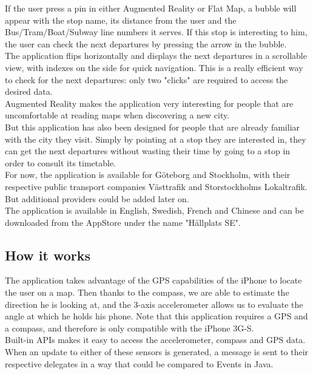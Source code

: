 If the user press a pin in either Augmented Reality or Flat Map, a bubble will appear with the stop name, its distance from the user and the Bus/Tram/Boat/Subway line numbers it serves. If this stop is interesting to him, the user can check the next departures by pressing the arrow in the bubble.\\

The application flips horizontally and displays the next departures in a scrollable view, with indexes on the side for quick navigation. This is a really efficient way to check for the next departures: only two "clicks" are required to access the desired data.\\

Augmented Reality makes the application very interesting for people that are uncomfortable at reading maps when discovering a new city.\\

But this application has also been designed for people that are already familiar with the city they visit. Simply by pointing at a stop they are interested in, they can get the next departures without wasting their time by going to a stop in order to consult its timetable.\\

For now, the application is available for Göteborg and Stockholm, with their respective public transport companies Västtrafik and Storstockholms Lokaltrafik. But additional providers could be added later on.\\

The application is available in English, Swedish, French and Chinese and can be downloaded from the AppStore under the name "Hållplats SE".

\subsection{How it works}

The application takes advantage of the GPS capabilities of the iPhone to locate the user on a map. Then thanks to the compass, we are able to estimate the direction he is looking at, and the 3-axis accelerometer allows us to evaluate the angle at which he holds his phone. Note that this application requires a GPS and a compass, and therefore is only compatible with the iPhone 3G-S.\\

Built-in APIs makes it easy to access the accelerometer, compass and GPS data. When an update to either of these sensors is generated, a message is sent to their respective delegates in a way that could be compared to Events in Java.\\

